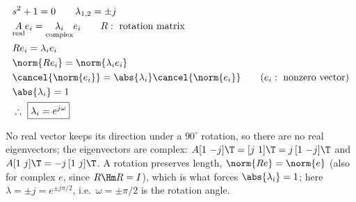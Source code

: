 \begin{minipage}{0.42\textwidth}
\centering
{}
\end{minipage}\hfill
\begin{minipage}{0.55\textwidth}
\begin{align*}
&s^2+1=0\qquad\lambda_{1,2}=\pm j\\
&\underset{\text{real}}{A}e_i=\underset{\text{complex}}{\lambda_i}e_i\qquad R:\text{ rotation matrix}\\
&Re_i=\lambda_ie_i\\
&\norm{Re_i}=\norm{\lambda_ie_i}\\
&\cancel{\norm{e_i}}=\abs{\lambda_i}\cancel{\norm{e_i}}\qquad (e_i:\text{ nonzero vector})\\
&\abs{\lambda_i}=1\\
&\therefore\ \boxed{\lambda_i=e^{j\omega}}
\end{align*}
\end{minipage}
\begin{insight}
No real vector keeps its direction under a $90^\circ$ rotation, so there are no real eigenvectors; the eigenvectors are complex: $A[1\ {-j}]\T=[j\ 1]\T=j\,[1\ {-j}]\T$ and $A[1\ j]\T=-j\,[1\ j]\T$. A rotation preserves length, $\norm{Re}=\norm{e}$ (also for complex $e$, since $R\Hm R=I$), which is what forces $\abs{\lambda_i}=1$; here $\lambda=\pm j=e^{\pm j\pi/2}$, i.e.\ $\omega=\pm\pi/2$ is the rotation angle.
\end{insight}

